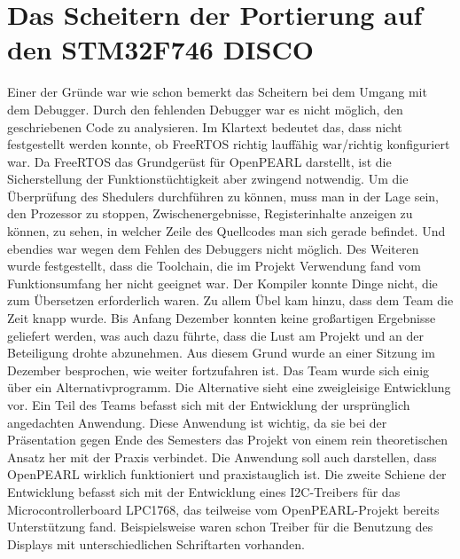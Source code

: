 \section{Das Scheitern der Portierung auf den STM32F746 DISCO}
Einer der Gründe war wie schon bemerkt das Scheitern bei dem Umgang mit dem Debugger. Durch den fehlenden Debugger war es nicht möglich, den geschriebenen Code zu analysieren. Im Klartext bedeutet das, dass nicht festgestellt werden konnte, ob FreeRTOS richtig lauffähig war/richtig konfiguriert war. Da FreeRTOS das Grundgerüst für OpenPEARL darstellt, ist die Sicherstellung der Funktionstüchtigkeit aber zwingend notwendig. Um die Überprüfung des Shedulers durchführen zu können, muss man in der Lage sein, den Prozessor zu stoppen, Zwischenergebnisse, Registerinhalte anzeigen zu können, zu sehen, in welcher Zeile des Quellcodes man sich gerade befindet. Und ebendies war wegen dem Fehlen des Debuggers nicht möglich. 
Des Weiteren wurde festgestellt, dass die Toolchain, die im Projekt Verwendung fand vom Funktionsumfang her nicht geeignet war. Der Kompiler konnte Dinge nicht, die zum Übersetzen erforderlich waren.
Zu allem Übel kam hinzu, dass dem Team die Zeit knapp wurde. Bis Anfang Dezember konnten keine großartigen Ergebnisse geliefert werden, was auch dazu führte, dass die Lust am Projekt und an der Beteiligung drohte abzunehmen. 
Aus diesem Grund wurde an einer Sitzung im Dezember besprochen, wie weiter fortzufahren ist. Das Team wurde sich einig über ein Alternativprogramm.
Die Alternative sieht eine zweigleisige Entwicklung vor. Ein Teil des Teams befasst sich mit der Entwicklung der ursprünglich angedachten Anwendung. Diese Anwendung ist wichtig, da sie bei der Präsentation gegen Ende des Semesters das Projekt von einem rein theoretischen Ansatz her mit der Praxis verbindet. Die Anwendung soll auch darstellen, dass OpenPEARL wirklich funktioniert und praxistauglich ist. Die zweite Schiene der Entwicklung befasst sich mit der Entwicklung eines I2C-Treibers für das Microcontrollerboard LPC1768, das teilweise vom OpenPEARL-Projekt bereits Unterstützung fand. Beispielsweise waren schon Treiber für die Benutzung des Displays mit unterschiedlichen Schriftarten vorhanden.
